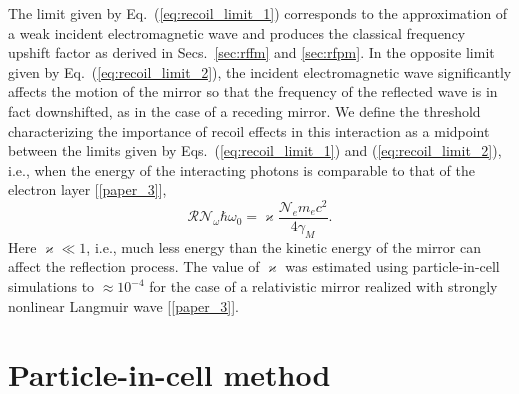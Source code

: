 \documentclass[10pt, a4paper, twoside, openright]{report}
\begin{document}
The limit given by Eq.~(\ref{eq:recoil_limit_1}) corresponds to the approximation of a weak incident electromagnetic wave and produces the classical frequency upshift factor as derived in Secs.~\ref{sec:rffm} and \ref{sec:rfpm}. In the opposite limit given by Eq.~(\ref{eq:recoil_limit_2}), the incident electromagnetic wave significantly affects the motion of the mirror so that the frequency of the reflected wave is in fact downshifted, as in the case of a receding mirror. We define the threshold characterizing the importance of recoil effects in this interaction as a midpoint between the limits given by Eqs.~(\ref{eq:recoil_limit_1}) and (\ref{eq:recoil_limit_2}), i.e., when the energy of the interacting photons is comparable to that of the electron layer [\ref{paper_3}],
\begin{equation}\label{eq:recoil_threshold}
	\mathcal{R} \mathcal{N}_{\omega} \hbar  \omega_0 = \varkappa \frac{\mathcal{N}_e m_e c^2}{4 \gamma_M}.
\end{equation}
Here $ \varkappa \ll 1 $, i.e., much less energy than the kinetic energy of the mirror can affect the reflection process. The value of $ \varkappa $ was estimated using particle-in-cell simulations to $ \approx 10^{-4} $ for the case of a relativistic mirror realized with strongly nonlinear Langmuir wave [\ref{paper_3}].




\section{Particle-in-cell method}
%


\end{document}
